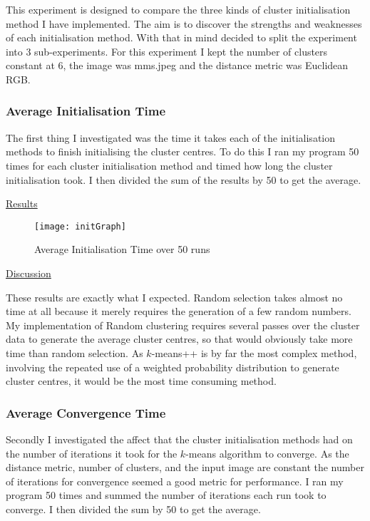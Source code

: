 \documentclass{article}
\begin{document}
This experiment is designed to compare the three kinds of cluster initialisation method I have implemented. The aim is to discover the strengths and weaknesses of each initialisation method. With that in mind decided to split the experiment into 3 sub-experiments. For this experiment I kept the number of clusters constant at 6, the image was mms.jpeg and the distance metric was Euclidean RGB.

\subsubsection{Average Initialisation Time}

The first thing I investigated was the time it takes each of the initialisation methods to finish initialising the cluster centres. To do this I ran my program 50 times for each cluster initialisation method and timed how long the cluster initialisation took. I then divided the sum of the results by 50 to get the average.

\underline{Results}


\begin{figure}[H]
\begin{center}
\texttt{[image: initGraph]}
\caption{Average Initialisation Time over 50 runs}
\end{center}
\end{figure}



\underline{Discussion}

These results are exactly what I expected. Random selection takes almost no time at all because it merely requires the generation of a few random numbers. My implementation of Random clustering requires several passes over the cluster data to generate the average cluster centres, so that would obviously take more time than random selection. As $k$-means++ is by far the most complex method, involving the repeated use of a weighted probability distribution to generate cluster centres, it would be the most time consuming method.


\subsubsection{Average Convergence Time}

Secondly I investigated the affect that the cluster initialisation methods had on the number of iterations it took for the $k$-means algorithm to converge. As the distance metric, number of clusters, and the input image are constant the number of iterations for convergence seemed a good metric for performance. I ran my program 50 times and summed the number of iterations each run took to converge. I then divided the sum by 50 to get the average.
\end{document}
